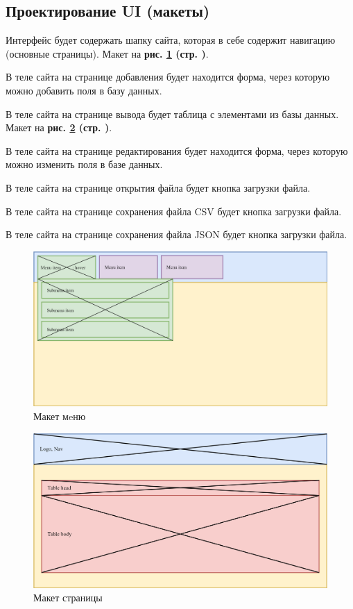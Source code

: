 \newpage

\subsection{Проектирование UI (макеты)}

Интерфейс будет содержать шапку сайта, которая в себе содержит навигацию (основные страницы).
Макет на \textbf{рис. \ref{fig:gpi_ui_menu} (стр. \pageref{fig:gpi_ui_menu})}.

В теле сайта на странице добавления будет находится форма,
через которую можно добавить поля в базу данных.

В теле сайта на странице вывода будет таблица с элементами из базы данных.
Макет на \textbf{рис. \ref{fig:gpi_ui_get} (стр. \pageref{fig:gpi_ui_get})}.

В теле сайта на странице редактирования будет находится форма,
через которую можно изменить поля в базе данных.

В теле сайта на странице открытия файла будет кнопка загрузки файла.

В теле сайта на странице сохранения файла CSV будет кнопка загрузки файла.

В теле сайта на странице сохранения файла JSON будет кнопка загрузки файла.

\begin{figure}[!htp]
    \centering
    \includegraphics[width=12cm]
        {_assets/gpi_ui_menu.png}
    \caption{Макет мeню}
    \label{fig:gpi_ui_menu}
\end{figure}

\begin{figure}[!htp]
    \centering
    \includegraphics[width=12cm]
        {_assets/gpi_ui_get.png}
    \caption{Макет страницы}
    \label{fig:gpi_ui_get}
\end{figure}

\newpage

